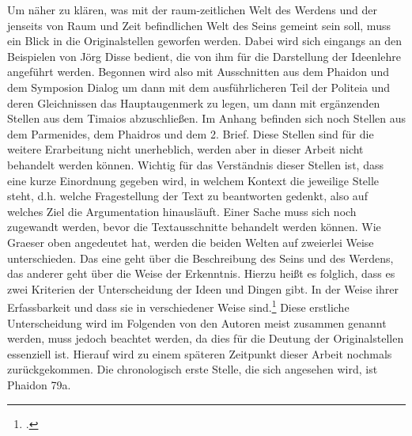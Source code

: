 Um näher zu klären, was mit der raum-zeitlichen Welt des Werdens und der jenseits von Raum und Zeit befindlichen Welt des Seins gemeint sein soll, muss ein Blick in die Originalstellen geworfen werden. Dabei wird sich eingangs an den Beispielen von Jörg Disse bedient, die von ihm für die Darstellung der Ideenlehre angeführt werden. Begonnen wird also mit Ausschnitten aus dem Phaidon und dem Symposion Dialog um dann mit dem ausführlicheren Teil der Politeia und deren Gleichnissen das Hauptaugenmerk zu legen, um dann mit ergänzenden Stellen aus dem Timaios abzuschließen. 
Im Anhang befinden sich noch Stellen aus dem Parmenides, dem Phaidros und dem 2. Brief. Diese Stellen sind für die weitere Erarbeitung nicht unerheblich, werden aber in dieser Arbeit nicht behandelt werden können.
Wichtig für das Verständnis dieser Stellen ist, dass eine kurze Einordnung gegeben wird, in welchem Kontext die jeweilige Stelle steht, d.h. welche Fragestellung der Text zu beantworten gedenkt, also auf welches Ziel die Argumentation hinausläuft.
Einer Sache muss sich noch zugewandt werden, bevor die Textausschnitte behandelt werden können. Wie Graeser oben angedeutet hat, werden die beiden Welten auf zweierlei Weise unterschieden. Das eine geht über die Beschreibung des Seins und des Werdens, das anderer geht über die Weise der Erkenntnis. Hierzu heißt es folglich, dass es zwei Kriterien der Unterscheidung der Ideen und Dingen gibt. In der Weise ihrer Erfassbarkeit und dass sie in verschiedener Weise sind.\footcite[vgl.][S. 40]{Martin73}
Diese erstliche Unterscheidung wird im Folgenden von den Autoren meist zusammen genannt werden, muss jedoch beachtet werden, da dies für die Deutung der Originalstellen essenziell ist. Hierauf wird zu einem späteren Zeitpunkt dieser Arbeit nochmals zurückgekommen. Die chronologisch erste Stelle, die sich angesehen wird, ist Phaidon 79a.
